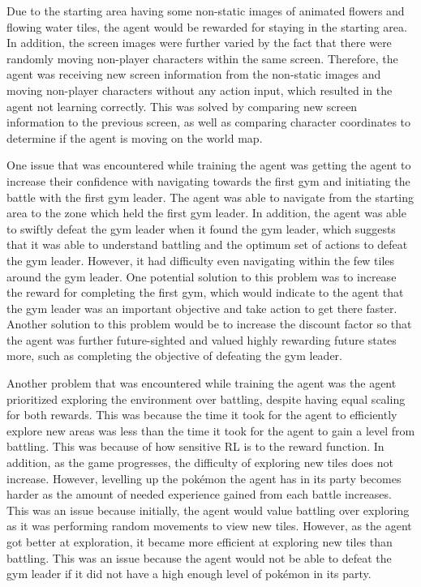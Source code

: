 Due to the starting area having some non-static images of animated flowers and flowing water tiles, the agent would be rewarded for staying in the starting area. In addition, the screen images were further varied by the fact that there were randomly moving non-player characters within the same screen. Therefore, the agent was receiving new screen information from the non-static images and moving non-player characters without any action input, which resulted in the agent not learning correctly. This was solved by comparing new screen information to the previous screen, as well as comparing character coordinates to determine if the agent is moving on the world map. 

One issue that was encountered while training the agent was getting the agent to increase their confidence with navigating towards the first gym and initiating the battle with the first gym leader. The agent was able to navigate from the starting area to the zone which held the first gym leader. In addition, the agent was able to swiftly defeat the gym leader when it found the gym leader, which suggests that it was able to understand battling and the optimum set of actions to defeat the gym leader. However, it had difficulty even navigating within the few tiles around the gym leader. One potential solution to this problem was to increase the reward for completing the first gym, which would indicate to the agent that the gym leader was an important objective and take action to get there faster. Another solution to this problem would be to increase the discount factor so that the agent was further future-sighted and valued highly rewarding future states more, such as completing the objective of defeating the gym leader. 

Another problem that was encountered while training the agent was the agent prioritized exploring the environment over battling, despite having equal scaling for both rewards. This was because the time it took for the agent to efficiently explore new areas was less than the time it took for the agent to gain a level from battling. This was because of how sensitive RL is to the reward function. In addition, as the game progresses, the difficulty of exploring new tiles does not increase. However, levelling up the pokémon the agent has in its party becomes harder as the amount of needed experience gained from each battle increases. This was an issue because initially, the agent would value battling over exploring as it was performing random movements to view new tiles. However, as the agent got better at exploration, it became more efficient at exploring new tiles than battling. This was an issue because the agent would not be able to defeat the gym leader if it did not have a high enough level of pokémon in its party. 

